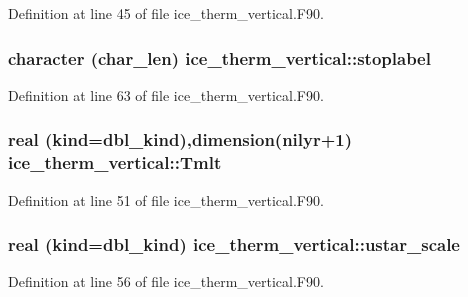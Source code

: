 Definition at line 45 of file ice\_\-therm\_\-vertical.F90.\hypertarget{namespaceice__therm__vertical_a11814e124127a01f102f5b38e9ede650}{
\subsubsection[{stoplabel}]{\setlength{\rightskip}{0pt plus 5cm}character (char\_\-len) {\bf ice\_\-therm\_\-vertical::stoplabel}}}
\label{namespaceice__therm__vertical_a11814e124127a01f102f5b38e9ede650}


Definition at line 63 of file ice\_\-therm\_\-vertical.F90.\hypertarget{namespaceice__therm__vertical_a25807d5de9fde0e10364d63e32691919}{
\subsubsection[{Tmlt}]{\setlength{\rightskip}{0pt plus 5cm}real (kind=dbl\_\-kind),dimension(nilyr+1) {\bf ice\_\-therm\_\-vertical::Tmlt}}}
\label{namespaceice__therm__vertical_a25807d5de9fde0e10364d63e32691919}


Definition at line 51 of file ice\_\-therm\_\-vertical.F90.\hypertarget{namespaceice__therm__vertical_a95faafaf9b21d14aa8dcf5fd91e50cac}{
\subsubsection[{ustar\_\-scale}]{\setlength{\rightskip}{0pt plus 5cm}real (kind=dbl\_\-kind) {\bf ice\_\-therm\_\-vertical::ustar\_\-scale}}}
\label{namespaceice__therm__vertical_a95faafaf9b21d14aa8dcf5fd91e50cac}


Definition at line 56 of file ice\_\-therm\_\-vertical.F90.
